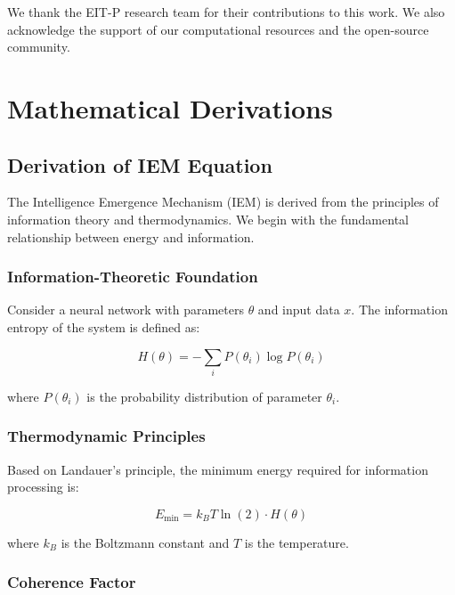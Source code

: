\documentclass[12pt]{article}
\begin{document}
We thank the EIT-P research team for their contributions to this work. We also acknowledge the support of our computational resources and the open-source community.




\appendix

\section{Mathematical Derivations}

\subsection{Derivation of IEM Equation}

The Intelligence Emergence Mechanism (IEM) is derived from the principles of information theory and thermodynamics. We begin with the fundamental relationship between energy and information.

\subsubsection{Information-Theoretic Foundation}

Consider a neural network with parameters $\theta$ and input data $x$. The information entropy of the system is defined as:

\begin{equation}
H(\theta) = -\sum_{i} P(\theta_i) \log P(\theta_i)
\end{equation}

where $P(\theta_i)$ is the probability distribution of parameter $\theta_i$.

\subsubsection{Thermodynamic Principles}

Based on Landauer's principle, the minimum energy required for information processing is:

\begin{equation}
E_{\min} = k_B T \ln(2) \cdot H(\theta)
\end{equation}

where $k_B$ is the Boltzmann constant and $T$ is the temperature.

\subsubsection{Coherence Factor}
\end{document}
